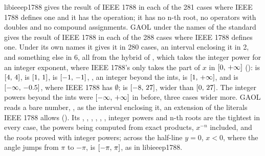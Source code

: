 \documentclass[12pt,a4paper,twoside,openright]{book}
\begin{document}
\medskip
libieeep1788 gives the result of IEEE 1788 in each of the 281 cases where
IEEE 1788 defines one and it has the operation; it has no n-th root, no
operators with doubles and no compound assignments. GAOL under the names of
the standard gives the result of IEEE 1788 in each of the 288 cases where
IEEE 1788 defines one.\newinvfive{} Under its own names it gives it in 280
cases, an interval enclosing it in 2, and something else in 6, all from the
hybrid  of , which takes the integer power for an
integer exponent, where IEEE 1788's  only takes the part of $x$ in
$[0,\,+\infty]$ ():  is
$[4,\,4]$,  is $[1,\,1]$,
 is $[-1,\,-1]$,
, an integer beyond the ints, is
$[1,\,+\infty]$, and  is $[-\infty,\,-0.5]$,
where IEEE 1788 has $\emptyset$;  is $[-8,\,27]$,
wider than $[0,\,27]$. The integer powers beyond the ints were
$[-\infty,\,+\infty]$ in  before, three cases wider
more.\newinvfive{} GAOL reads a bare number, ,
as the interval enclosing it, an extension of the literals IEEE 1788 allows
(). Its , , ,
, , , integer powers and n-th roots are
the tightest in every case, the powers being computed from exact products,
$x^{-n}$ included, and the roots proved with integer powers; across the
half-line $y = 0$, $x < 0$, where the angle jumps from $\pi$ to $-\pi$,
 is $[-\pi,\,\pi]$, as in libieeep1788.
\end{document}
